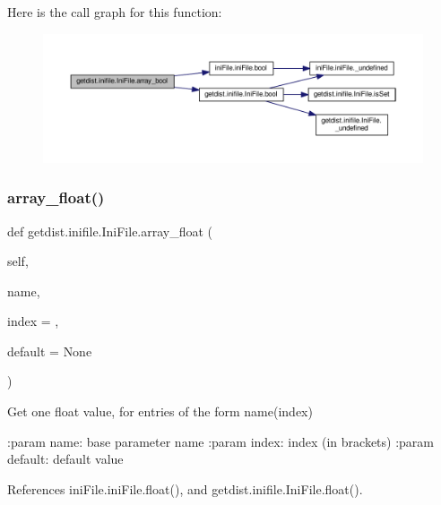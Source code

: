 Here is the call graph for this function\+:
\nopagebreak
\begin{figure}[H]
\begin{center}
\leavevmode
\includegraphics[width=350pt]{classgetdist_1_1inifile_1_1IniFile_aa3eae602ee8edc5f78f1cb63dbb8f138_cgraph}
\end{center}
\end{figure}
\mbox{\label{classgetdist_1_1inifile_1_1IniFile_a6ffefc5aa732378e03adde8b83e88b96}} 
\subsubsection{\texorpdfstring{array\+\_\+float()}{array\_float()}}
{\footnotesize\ttfamily def getdist.\+inifile.\+Ini\+File.\+array\+\_\+float (\begin{DoxyParamCaption}\item[{}]{self,  }\item[{}]{name,  }\item[{}]{index = {},  }\item[{}]{default = {\ttfamily None} }\end{DoxyParamCaption})}

\begin{DoxyVerb}Get one float value, for entries of the form name(index)

:param name: base parameter name
:param index: index (in brackets)
:param default: default value
\end{DoxyVerb}
 

References ini\+File.\+ini\+File.\+float(), and getdist.\+inifile.\+Ini\+File.\+float().

